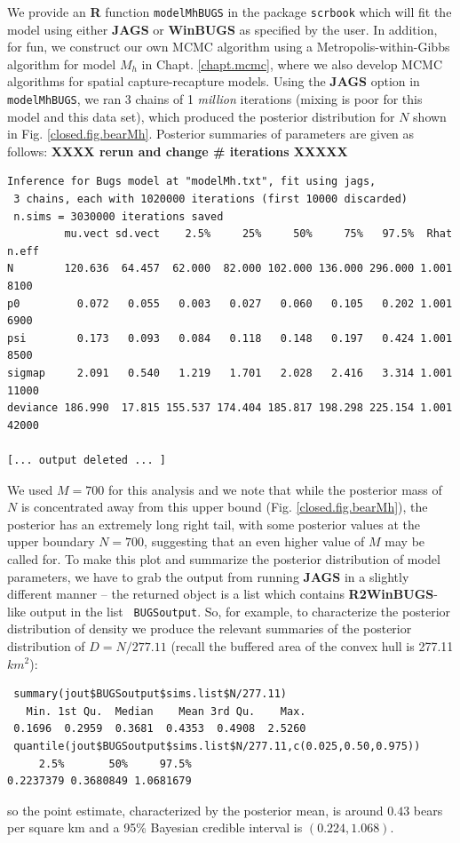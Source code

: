 We provide an {\bf R}
function \mbox{\tt modelMhBUGS} in the package \mbox{\tt scrbook} which will
fit the model using either {\bf JAGS} or {\bf WinBUGS} as specified by
the user.
In addition, for fun, we construct our own MCMC algorithm using a
Metropolis-within-Gibbs algorithm
for model $M_{h}$ in Chapt. \ref{chapt.mcmc}, where we
also develop MCMC  algorithms for spatial capture-recapture models.
Using the {\bf JAGS} option in \mbox{\tt modelMhBUGS}, we
ran 3 chains of 1 {\it million} iterations 
(mixing is poor for this model and this data set), which produced
 the posterior distribution for $N$ shown
in Fig. \ref{closed.fig.bearMh}. Posterior summaries of parameters are
given as follows: {\bf XXXX rerun and change \# iterations XXXXX}
{\small
\begin{verbatim}
Inference for Bugs model at "modelMh.txt", fit using jags,
 3 chains, each with 1020000 iterations (first 10000 discarded)
 n.sims = 3030000 iterations saved
         mu.vect sd.vect    2.5%     25%     50%     75%   97.5%  Rhat n.eff
N        120.636  64.457  62.000  82.000 102.000 136.000 296.000 1.001  8100
p0         0.072   0.055   0.003   0.027   0.060   0.105   0.202 1.001  6900
psi        0.173   0.093   0.084   0.118   0.148   0.197   0.424 1.001  8500
sigmap     2.091   0.540   1.219   1.701   2.028   2.416   3.314 1.001 11000
deviance 186.990  17.815 155.537 174.404 185.817 198.298 225.154 1.001 42000

[... output deleted ... ]
\end{verbatim}
}

We used $M=700$ for this analysis and we
note that  while the posterior mass of $N$ is concentrated away from this
upper bound (Fig. \ref{closed.fig.bearMh}), the posterior has an
extremely long right tail, with some posterior values at the upper
boundary $N=700$, suggesting that an even higher value of $M$ may be
called for. To make this plot and summarize the posterior distribution
of model parameters, we have to grab the output from running {\bf
  JAGS} in a slightly different manner -- the returned object is a
list which contains {\bf R2WinBUGS}-like output in the list \mbox{\tt
  BUGSoutput}.
So, for example, 
to characterize the posterior distribution of density we produce the
relevant summaries of the posterior distribution of $D  = N/277.11$
(recall 
the buffered area of the convex hull is 277.11 $km^2$):
{\small
\begin{verbatim}
 summary(jout$BUGSoutput$sims.list$N/277.11)
   Min. 1st Qu.  Median    Mean 3rd Qu.    Max. 
 0.1696  0.2959  0.3681  0.4353  0.4908  2.5260 
 quantile(jout$BUGSoutput$sims.list$N/277.11,c(0.025,0.50,0.975))
     2.5%       50%     97.5% 
0.2237379 0.3680849 1.0681679 
\end{verbatim}
}
so the point estimate, characterized by the posterior mean, is around
$0.43$ bears per square km and a 95\% Bayesian credible interval is
$(0.224, 1.068)$.


